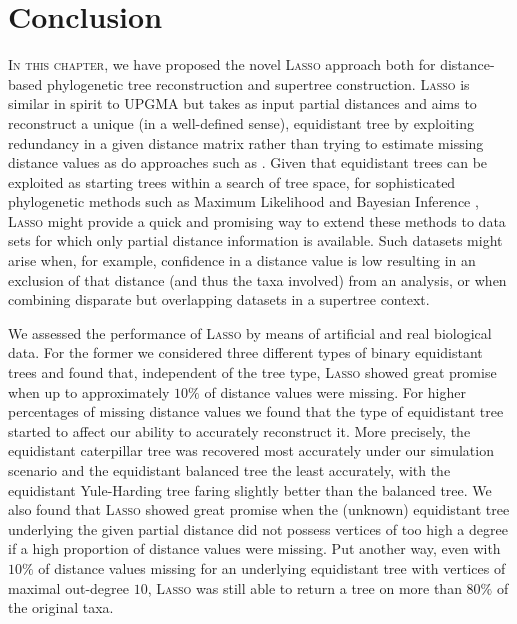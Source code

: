\section{Conclusion}
\label{sec:conclusion-lasso}

\textsc{In this chapter}, we have proposed the novel \textsc{Lasso} approach
both for distance-based phylogenetic tree reconstruction and supertree
construction.  \textsc{Lasso} is similar in spirit to \textsc{UPGMA} but takes
as input partial distances and aims to reconstruct a unique (in a well-defined
sense), equidistant tree by exploiting redundancy in a given distance matrix
rather than trying to estimate missing distance values as do approaches such
as \cite{criscuolo2008fastnj}. Given that equidistant trees can be exploited
as starting trees within a search of tree space, for sophisticated
phylogenetic methods such as Maximum Likelihood and Bayesian Inference
\cite{burbrink09molecular,bouckaert14beast}, \textsc{Lasso} might provide a
quick and promising way to extend these methods to data sets for which only
partial distance information is available. Such datasets might arise when, for
example, confidence in a distance value is low resulting in an exclusion of
that distance (and thus the taxa involved) from an analysis, or when combining
disparate but overlapping datasets in a supertree context.

We assessed the performance of \textsc{Lasso} by means of artificial and real
biological data.  For the former we considered three different types of binary
equidistant trees and found that, independent of the tree type, \textsc{Lasso}
showed great promise when up to approximately $10\%$ of distance values were
missing.  For higher percentages of missing distance values we found that the
type of equidistant tree started to affect our ability to accurately
reconstruct it. More precisely, the equidistant caterpillar tree was recovered
most accurately under our simulation scenario and the equidistant balanced
tree the least accurately, with the equidistant Yule-Harding tree faring
slightly better than the balanced tree.  We also found that \textsc{Lasso}
showed great promise when the (unknown) equidistant tree underlying the given
partial distance did not possess vertices of too high a degree if a high
proportion of distance values were missing.  Put another way, even with $10\%$
of distance values missing for an underlying equidistant tree with vertices of
maximal out-degree $10$, \textsc{Lasso} was still able to return a tree on
more than $80\%$ of the original taxa.

